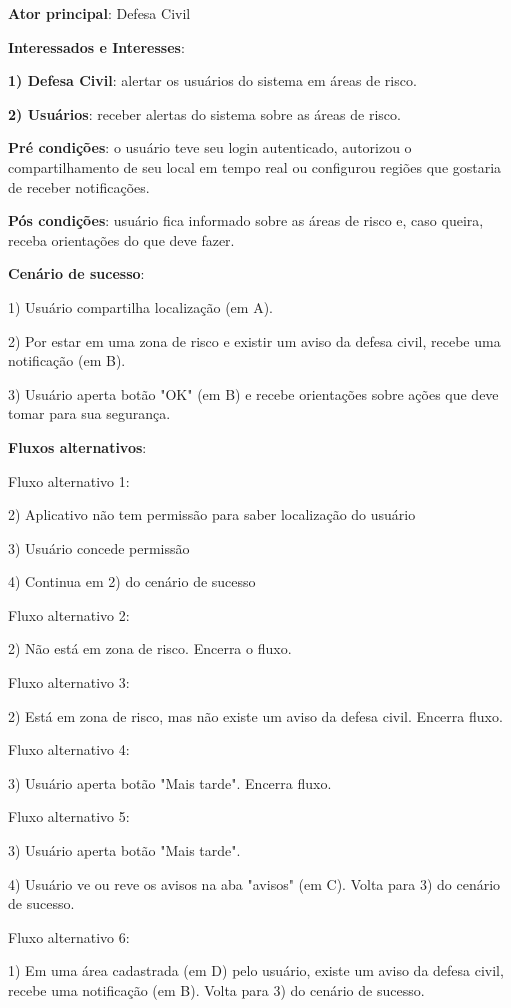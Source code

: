 \documentclass[12pt]{article}
\begin{document}
\textbf{Ator principal}: Defesa Civil

\textbf{Interessados e Interesses}:

\textbf{1) Defesa Civil}: alertar os usuários do sistema em áreas de risco.

\textbf{2) Usuários}: receber alertas do sistema sobre as áreas de risco.

\textbf{Pré condições}: o usuário teve seu login autenticado, autorizou o compartilhamento de seu local em tempo real ou configurou regiões que gostaria de receber notificações.

\textbf{Pós condições}: usuário fica informado sobre as áreas de risco e, caso queira, receba orientações do que deve fazer.

\textbf{Cenário de sucesso}:

1) Usuário compartilha localização (em A). 

2) Por estar em uma zona de risco e existir um aviso da defesa civil, recebe uma notificação (em B).

3) Usuário aperta botão "OK" (em B) e recebe orientações sobre ações que deve tomar para sua segurança.


\textbf{Fluxos alternativos}:

Fluxo alternativo 1:

2) Aplicativo não tem permissão para saber localização do usuário

3) Usuário concede permissão

4) Continua em 2) do cenário de sucesso

Fluxo alternativo 2:

2) Não está em zona de risco. Encerra o fluxo.

Fluxo alternativo 3:

2) Está em zona de risco, mas não existe um aviso da defesa civil. Encerra fluxo.

Fluxo alternativo 4:

3) Usuário aperta botão "Mais tarde". Encerra fluxo.

Fluxo alternativo 5:

3) Usuário aperta botão "Mais tarde".

4) Usuário ve ou reve os avisos na aba "avisos" (em C). Volta para 3) do cenário de sucesso.

Fluxo alternativo 6:

1) Em uma área cadastrada (em D) pelo usuário, existe um aviso da defesa civil, recebe uma notificação (em B). Volta para 3) do cenário de sucesso.
\end{document}

